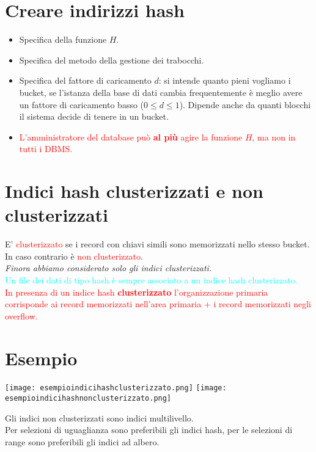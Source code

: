 \documentclass[12pt]{article}
\begin{document}
\section{Creare indirizzi hash}
\begin{itemize}
    \item Specifica della funzione $H$.
    \item Specifica del metodo della gestione dei trabocchi.
    \item Specifica del fattore di caricamento $d$: si intende quanto pieni vogliamo i bucket, se l'istanza della base di dati cambia frequentemente è meglio avere un fattore di caricamento basso ($0\leq d\leq1$). Dipende anche da quanti blocchi il sistema decide di tenere in un bucket.
    \item \textcolor{red}{L'amministratore del database può \textbf{al più} agire la funzione $H$, ma non in tutti i DBMS.}
\end{itemize}
\section{Indici hash clusterizzati e non clusterizzati}
E' \textcolor{red}{clusterizzato} se i record con chiavi simili sono memorizzati nello stesso bucket. In caso contrario è \textcolor{red}{non clusterizzato}.\\
\textit{Finora abbiamo considerato solo gli indici clusterizzati.}
\\\textcolor{Cyan}{Un file dei dati di tipo hash è sempre associato a un indice hash clusterizzato.}
\\\textcolor{red}{In presenza di un indice hash \textbf{clusterizzato} l'organizzazione primaria corrisponde ai record memorizzati nell'area primaria + i record memorizzati negli overflow.}
\section{Esempio}
\begin{center}
    \texttt{[image: esempioindicihashclusterizzato.png]}
    \texttt{[image: esempioindicihashnonclusterizzato.png]}
\end{center}
Gli indici non clusterizzati sono indici multilivello.\\
Per selezioni di uguaglianza sono preferibili gli indici hash, per le selezioni di range sono preferibili gli indici ad albero.
\end{document}
